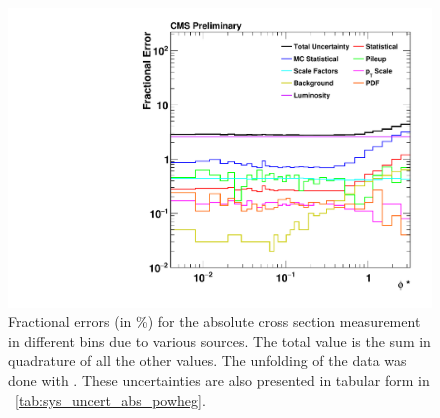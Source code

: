 \begin{figure}[!htbp]
    \centering
    \includegraphics[width=\textwidth]{figures/data_uncertainty_absolute_powheg_unfolded.pdf}
    \caption[
        Fractional errors (in \%) for the absolute cross section measurement.
    ]{
        Fractional errors (in \%) for the absolute cross section measurement in
        different \phistar bins due to various sources. The total value is the
        sum in quadrature of all the other values. The unfolding of the data
        was done with \POWHEG. These uncertainties are also presented in
        tabular form in \TAB~\ref{tab:sys_uncert_abs_powheg}.
    }
    \label{fig:sys_uncert_abs_powheg}
\end{figure}
